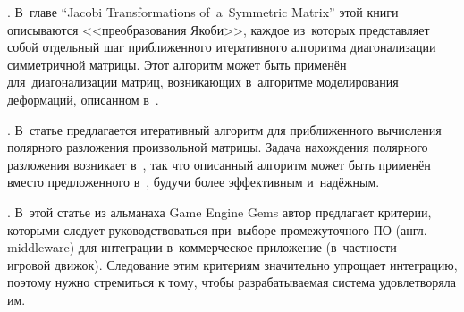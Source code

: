 \documentclass[a4paper,11pt]{report}
\begin{document}
    \cite[Numerical Recipes...]{fortran-jacobi}. В~главе {\English ``Jacobi Transformations
      of~a~Symmetric Matrix''} этой книги описываются <<преобразования Якоби>>, каждое из~которых
      представляет собой отдельный шаг приближенного итеративного алгоритма диагонализации
      симметричной матрицы. Этот алгоритм может быть применён для~диагонализации матриц, возникающих
      в~алгоритме моделирования деформаций, описанном в~\cite{mueller-meshless}.

    \cite[Frobenius Iteration for the Matrix Polar Decomposition]{hp-polar}. В~статье
      предлагается итеративный алгоритм для приближенного вычисления полярного разложения
      произвольной матрицы. Задача нахождения полярного разложения возникает в~\cite{mueller-meshless},
      так что описанный алгоритм может быть применён вместо предложенного в~\cite{mueller-meshless},
      будучи более эффективным и~надёжным.

    \cite[What to Look for When Evaluating Middleware for Integration]{gems-middleware}.
      В~этой статье из альманаха {\English Game Engine Gems} автор предлагает критерии, которыми
      следует руководствоваться при~выборе промежуточного ПО (англ. {\English middleware}) для интеграции
      в~коммерческое приложение (в~частности --- игровой движок). Следование этим критериям
      значительно упрощает интеграцию, поэтому нужно стремиться к тому, чтобы разрабатываемая
      система удовлетворяла им.
\end{document}
